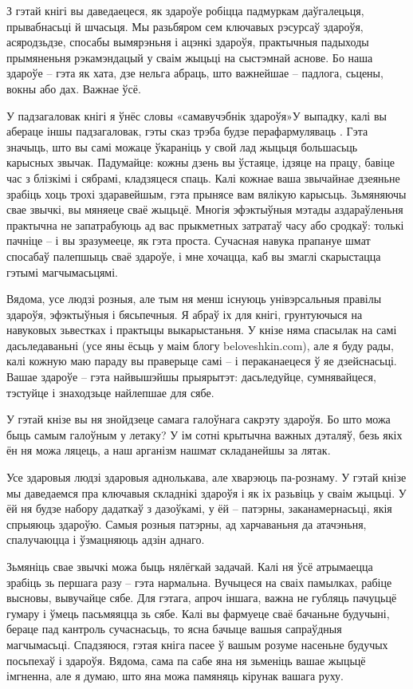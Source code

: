 З гэтай кнігі вы даведаецеся, як здароўе робіцца падмуркам даўгалецьця, прывабнасьці й шчасьця. Мы разьбяром сем ключавых рэсурсаў здароўя, асяродзьдзе, спосабы вымярэньня і ацэнкі здароўя, практычныя падыходы прымяненьня рэкамэндацый у сваім жыцьці на сыстэмнай аснове. Бо наша здароўе – гэта як хата, дзе нельга абраць, што важнейшае – падлога, сьцены, вокны або дах. Важнае ўсё.

У падзагаловак кнігі я ўнёс словы «самавучэбнік здароўя»У выпадку, калі вы абераце іншы падзагаловак, гэты сказ трэба будзе перафармуляваць . Гэта значыць, што вы самі можаце ўкараніць у свой лад жыцьця большасьць карысных звычак. Падумайце: кожны дзень вы ўстаяце, ідзяце на працу, бавіце час з блізкімі і сябрамі, кладзяцеся спаць. Калі кожнае ваша звычайнае дзеяньне зрабіць хоць трохі здаравейшым, гэта прынясе вам вялікую карысьць. Зьмяняючы свае звычкі, вы мяняеце сваё жыцьцё. Многія эфэктыўныя мэтады аздараўленьня практычна не запатрабуюць ад вас прыкметных затратаў часу або сродкаў: толькі пачніце – і вы зразумееце, як гэта проста. Сучасная навука прапануе шмат спосабаў палепшыць сваё здароўе, і мне хочацца, каб вы змаглі скарыстацца гэтымі магчымасьцямі.

Вядома, усе людзі розныя, але тым ня менш існуюць унівэрсальныя правілы здароўя, эфэктыўныя і бясьпечныя. Я абраў іх для кнігі, грунтуючыся на навуковых зьвестках і практыцы выкарыстаньня. У кнізе няма спасылак на самі дасьледаваньні (усе яны ёсьць у маім блогу beloveshkin.com), але я буду рады, калі кожную маю параду вы праверыце самі – і пераканаецеся ў яе дзейснасьці. Вашае здароўе – гэта найвышэйшы прыярытэт: дасьледуйце, сумнявайцеся, тэстуйце і знаходзьце найлепшае для сябе.

У гэтай кнізе вы ня знойдзеце самага галоўнага сакрэту здароўя. Бо што можа быць самым галоўным у летаку? У ім сотні крытычна важных дэталяў, безь якіх ён ня можа ляцець, а наш арганізм нашмат складанейшы за лятак.

Усе здаровыя людзі здаровыя аднолькава, але хварэюць па-рознаму. У гэтай кнізе мы даведаемся пра ключавыя складнікі здароўя і як іх разьвіць у сваім жыцьці. У ёй ня будзе набору дадаткаў з дазоўкамі, у ёй – патэрны, заканамернасьці, якія спрыяюць здароўю. Самыя розныя патэрны, ад харчаваньня да атачэньня, спалучаюцца і ўзмацняюць адзін аднаго.

Зьмяніць свае звычкі можа быць нялёгкай задачай. Калі ня ўсё атрымаецца зрабіць зь першага разу – гэта нармальна. Вучыцеся на сваіх памылках, рабіце высновы, вывучайце сябе. Для гэтага, апроч іншага, важна не губляць пачуцьцё гумару і ўмець пасьмяяцца зь сябе. Калі вы фармуеце сваё бачаньне будучыні, бераце пад кантроль сучаснасьць, то ясна бачыце вашыя сапраўдныя магчымасьці. Спадзяюся, гэтая кніга пасее ў вашым розуме насеньне будучых посьпехаў і здароўя. Вядома, сама па сабе яна ня зьменіць вашае жыцьцё імгненна, але я думаю, што яна можа памяняць кірунак вашага руху. 

